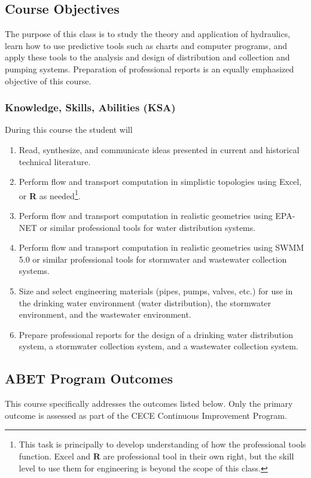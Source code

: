 \documentclass[12pt]{article}
\begin{document}
\subsection*{{Course Objectives}}
The purpose of this class is to study the theory and application of hydraulics, learn how to use predictive tools such as charts and computer programs, and apply these tools to the analysis and design of distribution and collection and pumping systems.  Preparation of professional reports is an equally emphasized objective of this course.
\subsubsection*{{Knowledge, Skills, Abilities (KSA)}}
During this course the student will
\begin{enumerate}
\item Read, synthesize, and communicate ideas presented in current and historical technical literature.
\item Perform flow and transport computation in simplistic topologies using Excel, or \textbf{R} as needed\footnote{This task is principally to develop understanding of how the professional tools function.  Excel and \textbf{R} are professional tool in their own right, but the skill level to use them for engineering is beyond the scope of this class.}.
\item Perform flow and transport computation in realistic geometries using EPA-NET or similar professional tools for water distribution systems.
\item Perform flow and transport computation in realistic geometries using SWMM 5.0 or similar professional tools for stormwater and wastewater collection systems.
\item Size and select engineering materials (pipes, pumps, valves, etc.) for use in the drinking water environment (water distribution), the stormwater environment, and the wastewater environment.
\item Prepare professional reports for the design of a drinking water distribution system, a stormwater collection system, and a wastewater collection system.  

\end{enumerate}

\subsection*{{ABET Program Outcomes}}
This course specifically addresses the outcomes listed below.  Only the primary outcome is assessed as part of the CECE Continuous Improvement Program.
\end{document}
